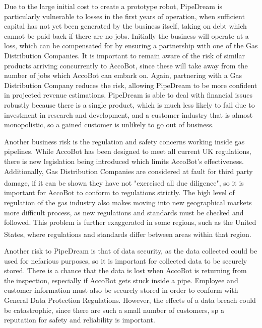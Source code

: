 \documentclass[11pt]{article}		%
\newcommand{\supercite}[1]{\textsuperscript{\cite{#1}}}		%
\begin{document}
     	Due to the large initial cost to create a prototype robot, PipeDream is particularly vulnerable to losses in the first years of operation, when sufficient capital has not yet been generated by the business itself, taking on debt which cannot be paid back if there are no jobs.
     	Initially the business will operate at a loss, which can be compensated for by ensuring a partnership with one of the Gas Distribution Companies.
     	It is important to remain aware of the risk of similar products arriving concurrently to AccoBot, since these will take away from the number of jobs which AccoBot can embark on.
     	Again, partnering with a Gas Distribution Company reduces the risk, allowing PipeDream to be more confident in projected revenue estimations.
     	PipeDream is able to deal with financial issues robustly because there is a single product, which is much less likely to fail due to investment in research and development, and a customer industry that is almost monopolistic, so a gained customer is unlikely to go out of business.
     	
     	Another business risk is the regulation and safety concerns working inside gas pipelines.
     	While AccoBot has been designed to meet all current UK regulations, there is new legislation being introduced which limits AccoBot's effectiveness.
     	Additionally, Gas Distribution Companies are considered at fault for third party damage, if it can be shown they have not "exercised all due diligence"\supercite{hse1996guide}, so it is important for AccoBot to conform to regulations strictly.
     	The high level of regulation of the gas industry also makes moving into new geographical markets more difficult process, as new regulations and standards must be checked and followed.
     	This problem is further exaggerated in some regions, such as the United States, where regulations and standards differ between areas within that region\supercite{pless2011making}.
     	
     	Another risk to PipeDream is that of data security, as the data collected could be used for nefarious purposes, so it is important for collected data to be securely stored.
     	There is a chance that the data is lost when AccoBot is returning from the inspection, especially if AccoBot gets stuck inside a pipe.
     	Employee and customer information must also be securely stored in order to conform with General Data Protection Regulations.
     	However, the effects of a data breach could be catastrophic, since there are such a small number of customers, sp a reputation for safety and reliability is important.
     	
\end{document}
